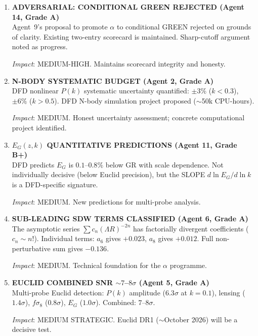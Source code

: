 \documentclass[11pt,a4paper]{article}
\begin{document}
\begin{enumerate}[label=\textbf{\arabic*.}, leftmargin=1.5cm]
\item \textbf{ADVERSARIAL: CONDITIONAL GREEN REJECTED (Agent 14, Grade A)}\\
Agent~9's proposal to promote $\alpha$ to conditional GREEN rejected on grounds of clarity. Existing two-entry scorecard is maintained. Sharp-cutoff argument noted as progress.

\textit{Impact}: MEDIUM-HIGH. Maintains scorecard integrity and honesty.

\item \textbf{N-BODY SYSTEMATIC BUDGET (Agent 2, Grade A)}\\
DFD nonlinear $P(k)$ systematic uncertainty quantified: $\pm 3\%$ ($k < 0.3$), $\pm 6\%$ ($k > 0.5$). DFD N-body simulation project proposed ($\sim$50k CPU-hours).

\textit{Impact}: MEDIUM. Honest uncertainty assessment; concrete computational project identified.

\item \textbf{$E_G(z,k)$ QUANTITATIVE PREDICTIONS (Agent 11, Grade B+)}\\
DFD predicts $E_G$ is $0.1$--$0.8\%$ below GR with scale dependence. Not individually decisive (below Euclid precision), but the SLOPE $d\ln E_G/d\ln k$ is a DFD-specific signature.

\textit{Impact}: MEDIUM. New predictions for multi-probe analysis.

\item \textbf{SUB-LEADING SDW TERMS CLASSIFIED (Agent 6, Grade A)}\\
The asymptotic series $\sum c_n(\Lambda R)^{-2n}$ has factorially divergent coefficients ($c_n \sim n!$). Individual terms: $a_6$ gives $+0.023$, $a_8$ gives $+0.012$. Full non-perturbative sum gives $-0.136$.

\textit{Impact}: MEDIUM. Technical foundation for the $\alpha$ programme.

\item \textbf{EUCLID COMBINED SNR $\sim 7$--$8\sigma$ (Agent 5, Grade A)}\\
Multi-probe Euclid detection: $P(k)$ amplitude ($6.3\sigma$ at $k = 0.1$), lensing ($1.4\sigma$), $f\sigma_8$ ($0.8\sigma$), $E_G$ ($1.0\sigma$). Combined: $7$--$8\sigma$.

\textit{Impact}: MEDIUM STRATEGIC. Euclid DR1 ($\sim$October 2026) will be a decisive test.

\end{enumerate}


\end{document}
